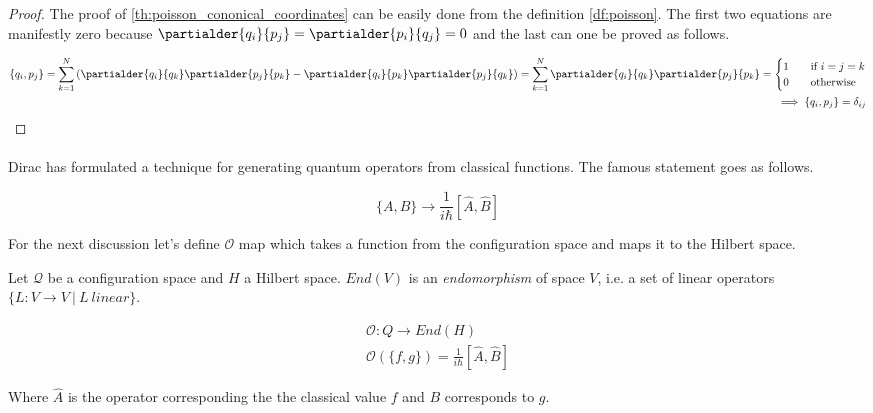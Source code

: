 \begin{proof}
    The proof of \ref{th:poisson_cononical_coordinates} can be easily done from the definition \ref{df:poisson}. 
    The first two equations are manifestly zero because $\partialder{q_{i}}{p_{j}} = \partialder{p_{i}}{q_{j}} = 0$
    and the last can one be proved as follows.

    \begin{equation}
        \begin{split}
            \{q_{i}, p_{j}\} = \sum_{k=1}^{N}\left(\partialder{q_{i}}{q_{k}} \partialder{p_{j}}{p_{k}} - \partialder{q_{i}}{p_{k}} \partialder{p_{j}}{q_{k}}\right) 
            = \sum_{k=1}^{N} \partialder{q_{i}}{q_{k}} \partialder{p_{j}}{p_{k}} = 
            \begin{cases}
                1  & \quad \text{if } i = j = k \\
                0  & \quad \text{otherwise}
            \end{cases} \\
            \implies \{q_{i}, p_{j}\} = \delta_{ij}
        \end{split}
    \end{equation}
\end{proof}

\paragraph{} Dirac has formulated a technique for generating quantum operators from
classical functions. The famous statement goes as follows.

\begin{equation}
    \{A, B\} \to \frac{1}{i \hbar}[\hat{A}, \hat{B}]
\end{equation}

For the next discussion let's define $\mathcal{O}$ map which takes a function from the configuration space
and maps it to the Hilbert space.

\begin{definition}
    \label{df:o_map}

    Let $\mathcal{Q}$ be a configuration space and $H$ a Hilbert space. $End(V)$ is an \textit{endomorphism} of space $V$, i.e. 
    a set of linear operators $\{L: V \to V \ | \  L \ linear\}$.

    \begin{equation}
        \begin{gathered}
            \mathcal{O}: Q \to End(H) \\
            \mathcal{O}(\{f, g\}) = \frac{1}{i \hbar}[\hat{A}, \hat{B}]
        \end{gathered}
    \end{equation}

    Where $\hat{A}$ is the operator corresponding the the classical value $f$ and $B$ corresponds to $g$.
\end{definition}

